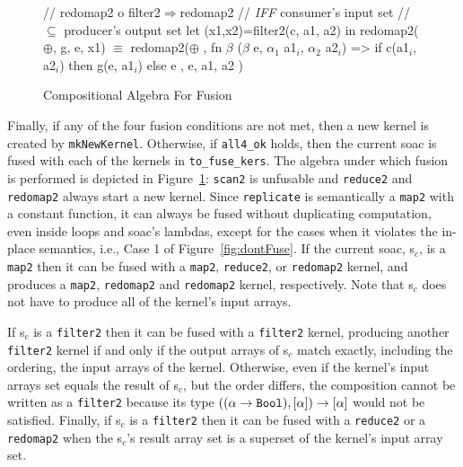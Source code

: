 \documentclass{sigplanconf}  %
\newcommand{\emp}[1]{\textcolor{DikuRed}{ #1}}
\newcommand{\emphh}[1]{\textcolor{CosGreen}{ #1}}
\newcommand{\mymath}[1]{$ #1 $}
\newcommand{\myindx}[1]{_{#1}}
\begin{document}
\begin{figure}[bt]
{\begin{minipage}{0.48\columnwidth}
\begin{colorcode}
//\emp{redomap2 o filter2\mymath{\Rightarrow}redomap2}
//\emp{{\em{}IFF} consumer's input set}
//\emp{  \mymath{\subseteq} producer's output set}
let (x1,x2)=filter2(c, a1, a2)
in  redomap2(\mymath{\oplus}, g, e, x1)
    \emphh{\mymath{\equiv}}
redomap2(\mymath{\oplus}
, fn \mymath{\beta} (\mymath{\beta} e, \mymath{\alpha\myindx{1}} a1\mymath{\myindx{i}}, \mymath{\alpha\myindx{2}} a2\mymath{\myindx{i}})
   => if c(a1\mymath{\myindx{i}}, a2\mymath{\myindx{i}})
      then g(e, a1\mymath{\myindx{i}}) else e
, e, a1, a2 )
\end{colorcode}
\end{minipage}
} 
\caption{Compositional Algebra For Fusion}
\label{fig:CompatFuse}
\end{figure}

Finally, if any of the four fusion conditions are not met, 
then a new kernel is created by {\tt mkNewKernel}.
Otherwise, if {\tt all4\_ok} holds, then the current {\sc soac}
is fused with each of the kernels in {\tt to\_fuse\_kers}.
%
The algebra under which fusion is performed is depicted in Figure~\ref{fig:CompatFuse}:
{\tt scan2} is unfusable and {\tt reduce2} and {\tt redomap2} always 
start a new kernel.  Since {\tt replicate} is semantically a {\tt map2} 
with a constant function, it can always be fused without duplicating
computation, even inside loops and {\sc soac}'s lambdas, except for the 
cases when it violates the in-place semantics, i.e., \emp{Case 1} of 
Figure~\ref{fig:dontFuse}.
%
If the current {\sc soac}, {\sc s}$_c$, is a {\tt map2} then it can be fused 
with a {\tt map2}, {\tt reduce2}, or {\tt redomap2} kernel, and produces 
a {\tt map2}, {\tt redomap2} and {\tt redomap2} kernel, respectively.
Note that {\sc s}$_c$ does not have to produce all of the kernel's input arrays.

If {\sc s}$_c$ is a {\tt filter2} then it can be fused with a {\tt filter2} kernel,
producing another {\tt filter2} kernel if and only if the output arrays
of {\sc s}$_c$ match exactly, including the ordering, the input arrays of the kernel. 
Otherwise, even if the kernel's input arrays set equals the result of {\sc s}$_c$,
but the order differs, the composition cannot be written as a {\tt filter2} because 
its type $((\alpha\rightarrow{\tt Bool}),[\alpha])\rightarrow[\alpha]$  %
would not be satisfied.   Finally, if {\sc s}$_c$ is a {\tt filter2} then it can be
fused with a {\tt reduce2} or a {\tt redomap2} when the {\sc s}$_c$'s result array set
is a superset of the kernel's input array set. 
\end{document}
